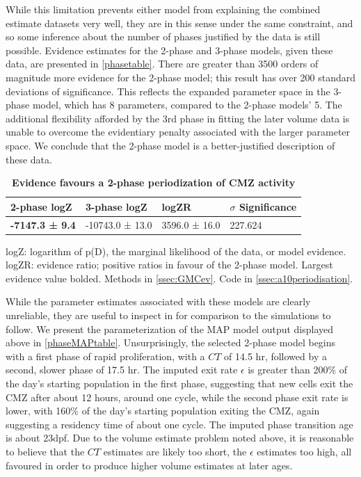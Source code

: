 \documentclass{ut-thesis}
\begin{document}
\begin{NoHyper}
While this limitation prevents either model from explaining the combined estimate datasets very well, they are in this sense under the same constraint, and so some inference about the number of phases justified by the data is still possible. Evidence estimates for the 2-phase and 3-phase models, given these data, are presented in \autoref{phasetable}. There are greater than 3500 orders of magnitude more evidence for the 2-phase model; this result has over 200 standard deviations of significance. This reflects the expanded parameter space in the 3-phase model, which has 8 parameters, compared to the 2-phase models' 5. The additional flexibility afforded by the 3rd phase in fitting the later volume data is unable to overcome the evidentiary penalty associated with the larger parameter space. We conclude that the 2-phase model is a better-justified description of these data.

\begin{table}[!ht]
    \centering
    \caption{{\bf Evidence favours a 2-phase periodization of CMZ activity}}
    \begin{tabular}{|l|l|l|l|} \hline 
        {\bf 2-phase logZ} & {\bf 3-phase logZ} & {\bf logZR} & {\bf $\sigma$ Significance}\\ \hline
        \textbf{-7147.3 ± 9.4} & -10743.0 ± 13.0 & 3596.0 ± 16.0 & 227.624\\ \hline
        \end{tabular}
    \begin{flushleft} logZ: logarithm of p(D), the marginal likelihood of the data, or model evidence. logZR: evidence ratio; positive ratios in favour of the 2-phase model. Largest evidence value bolded.
    Methods in \autoref{ssec:GMCev}.
    Code in \autoref{ssec:a10periodisation}.
    \end{flushleft}
    \label{phasetable}
\end{table}

While the parameter estimates associated with these models are clearly unreliable, they are useful to inspect in for comparison to the simulations to follow. We present the parameterization of the MAP model output displayed above in \autoref{phaseMAPtable}. Unsurprisingly, the selected 2-phase model begins with a first phase of rapid proliferation, with a $CT$ of 14.5 hr, followed by a second, slower phase of 17.5 hr. The imputed exit rate $\epsilon$ is greater than 200\% of the day's starting population in the first phase, suggesting that new cells exit the CMZ after about 12 hours, around one cycle, while the second phase exit rate is lower, with 160\% of the day's starting population exiting the CMZ, again suggesting a residency time of about one cycle. The imputed phase transition age is about 23dpf. Due to the volume estimate problem noted above, it is reasonable to believe that the $CT$ estimates are likely too short, the $\epsilon$ estimates too high, all favoured in order to produce higher volume estimates at later ages.


\end{NoHyper}
\end{document}
